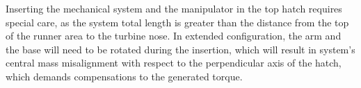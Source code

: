 Inserting the mechanical system and the manipulator in the top hatch requires
special care, as the system total length is greater than the distance from the
top of the runner area to the turbine nose. In extended configuration, the arm
and the base will need to be rotated during the insertion, which will result in
system's central mass misalignment with respect to the perpendicular axis of
the hatch, which demands compensations to the generated torque.






